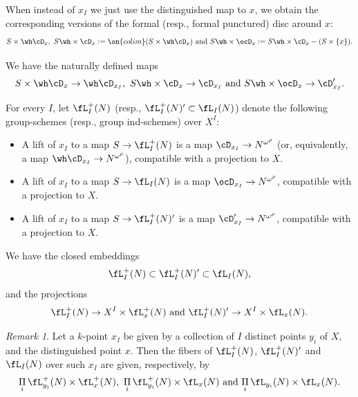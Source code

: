 \documentclass[9pt]{amsart}
\theoremstyle{definition}
\theoremstyle{remark}
\newtheorem{rem}[subsubsection]{Remark}
\numberwithin{equation}{section}
\begin{document}
\medskip

When instead of $x_I$ we just use the distinguished map to $x$, we obtain the corresponding versions of
the formal (resp., formal punctured) disc around $x$:
$$S\times \wh\cD_x,\,\, S\wh\times \cD_x:=\on{colim}(S\times \wh\cD_x) \text { and }
S\wh\times \ocD_x:=S\wh\times \cD_x-(S\times \{x\}).$$

We have the naturally defined maps
$$S\times \wh\cD_x\to \wh\cD_{x_I},\,\, 
S\wh\times \cD_x\to \cD_{x_I} \text{ and } S\wh\times \ocD_x\to \cD'_{x_I}.$$

\sssec{} \label{sss:rel loop groups}

For every $I$, let $\fL^+_I(N)$ (resp., $\fL^+_I(N)'\subset \fL_I(N)$) denote the following group-schemes 
(resp., group ind-schemes) over $X^I$:

\medskip

\begin{itemize} 

\item 
A lift of $x_I$ to a map $S\to \fL^+_I(N)$ is a map $\cD_{x_I}\to N^{\omega^\rho}$ (or, equivalently, a 
map $\wh\cD_{x_I}\to N^{\omega^\rho}$), compatible with a projection to $X$. 

\item 
A lift of $x_I$ to a map $S\to \fL_I(N)$ is a map $\ocD_{x_I}\to N^{\omega^\rho}$, compatible with a projection to $X$. 

\item A lift of $x_I$ to a map $S\to \fL^+_I(N)'$ is a map 
$\cD'_{x_I}\to N^{\omega^\rho}$, compatible with a projection to $X$.

\end{itemize} 

\medskip

We have the closed embeddings
$$\fL^+_I(N)\subset \fL^+_I(N)'\subset \fL_I(N),$$
and the projections
$$\fL^+_I(N)\to X^I\times \fL^+_x(N) \text{ and } \fL^+_I(N)'\to X^I\times \fL_x(N).$$

\begin{rem}
Let a $k$-point $x_I$ be given by a collection of $I$ distinct points $y_i$ of $X$, and the distinguished point $x$.
Then the fibers of $\fL^+_I(N)$, $\fL^+_I(N)'$ and $\fL_I(N)$ over such $x_I$ are given, respectively, by
$$\underset{i}\Pi\, \fL^+_{y_i}(N)\times \fL^+_{x}(N),\,\, 
\underset{i}\Pi\, \fL^+_{y_i}(N)\times \fL_x(N) \text{ and } \underset{i}\Pi\, \fL_{y_i}(N)\times \fL_x(N).$$
\end{rem}

\sssec{}
\end{document}

